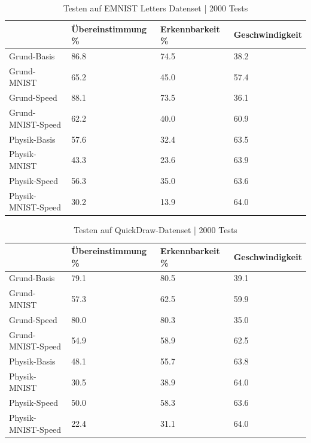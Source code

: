 \begin{table}[!ht]
    \centering
    \caption{Testen auf EMNIST Letters Datenset | 2000 Tests}\label{tab:EMNIST}
    \begin{tabular}{|l|l|l|l|}
    \hline
        ~ & Übereinstimmung \% & Erkennbarkeit \% & Geschwindigkeit \\ \hline
        Grund-Basis & 86.8 & 74.5 & 38.2 \\ \hline
        Grund-MNIST & 65.2 & 45.0 & 57.4 \\ \hline
        Grund-Speed & 88.1 & 73.5 & 36.1 \\ \hline
        Grund-MNIST-Speed & 62.2 & 40.0 & 60.9 \\ \hline
        Physik-Basis & 57.6 & 32.4 & 63.5 \\ \hline
        Physik-MNIST & 43.3 & 23.6 & 63.9 \\ \hline
        Physik-Speed & 56.3 & 35.0 & 63.6 \\ \hline
        Physik-MNIST-Speed & 30.2 & 13.9 & 64.0 \\ \hline
    \end{tabular}
\end{table}

\begin{table}[!ht]
    \centering
    \caption{Testen auf QuickDraw-Datenset | 2000 Tests}\label{tab:Quickdraw}
    \begin{tabular}{|l|l|l|l|}
    \hline
        ~ & Übereinstimmung \% & Erkennbarkeit \% & Geschwindigkeit \\ \hline
        Grund-Basis & 79.1 & 80.5 & 39.1 \\ \hline
        Grund-MNIST & 57.3 & 62.5 & 59.9 \\ \hline
        Grund-Speed & 80.0 & 80.3 & 35.0 \\ \hline
        Grund-MNIST-Speed & 54.9 & 58.9 & 62.5 \\ \hline
        Physik-Basis & 48.1 & 55.7 & 63.8 \\ \hline
        Physik-MNIST & 30.5 & 38.9 & 64.0 \\ \hline
        Physik-Speed & 50.0 & 58.3 & 63.6 \\ \hline
        Physik-MNIST-Speed & 22.4 & 31.1 & 64.0 \\ \hline
    \end{tabular}
\end{table}

\newpage

